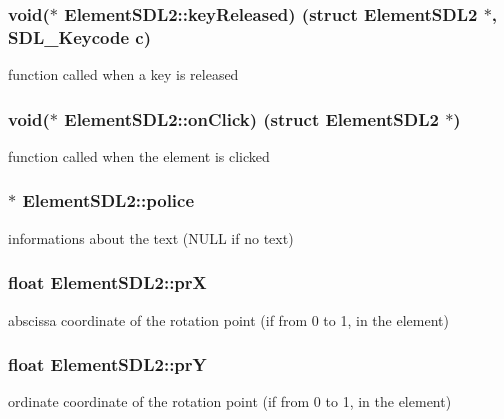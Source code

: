 \subsubsection[{\texorpdfstring{key\+Released}{keyReleased}}]{\setlength{\rightskip}{0pt plus 5cm}void($\ast$ Element\+S\+D\+L2\+::key\+Released) (struct {\bf Element\+S\+D\+L2} $\ast$, S\+D\+L\+\_\+\+Keycode c)}\hypertarget{structElementSDL2_a76ecf85adcb072db772a8351ea7e04ee}{}\label{structElementSDL2_a76ecf85adcb072db772a8351ea7e04ee}
function called when a key is released 
\subsubsection[{\texorpdfstring{on\+Click}{onClick}}]{\setlength{\rightskip}{0pt plus 5cm}void($\ast$ Element\+S\+D\+L2\+::on\+Click) (struct {\bf Element\+S\+D\+L2} $\ast$)}\hypertarget{structElementSDL2_ae56c022599e2e8acdda29fbb8af44942}{}\label{structElementSDL2_ae56c022599e2e8acdda29fbb8af44942}
function called when the element is clicked 
\subsubsection[{\texorpdfstring{police}{police}}]{$\ast$ Element\+S\+D\+L2\+::police}\hypertarget{structElementSDL2_a785d4fada0ba0ac6b5ce7a53c379f8cd}{}\label{structElementSDL2_a785d4fada0ba0ac6b5ce7a53c379f8cd}
informations about the text (N\+U\+LL if no text) 
\subsubsection[{\texorpdfstring{prX}{prX}}]{\setlength{\rightskip}{0pt plus 5cm}float Element\+S\+D\+L2\+::prX}\hypertarget{structElementSDL2_a9b522d7b8bf6b476d142fd0058aff66c}{}\label{structElementSDL2_a9b522d7b8bf6b476d142fd0058aff66c}
abscissa coordinate of the rotation point (if from 0 to 1, in the element) 
\subsubsection[{\texorpdfstring{prY}{prY}}]{\setlength{\rightskip}{0pt plus 5cm}float Element\+S\+D\+L2\+::prY}\hypertarget{structElementSDL2_a23b79d2468ca18e33071cd137f6961c6}{}\label{structElementSDL2_a23b79d2468ca18e33071cd137f6961c6}
ordinate coordinate of the rotation point (if from 0 to 1, in the element) 
